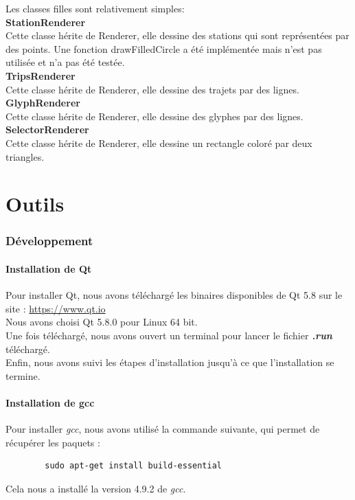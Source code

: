 \documentclass[12pt]{article}
\begin{document}
		Les classes filles sont relativement simples:\\
		
		\textbf{StationRenderer}\\
		Cette classe hérite de Renderer, elle dessine des stations qui sont représentées par des points. Une fonction drawFilledCircle a été implémentée mais n’est pas utilisée et n’a pas été testée.\\
		
		\textbf{TripsRenderer}\\
		Cette classe hérite de Renderer, elle dessine des trajets par des lignes. \\

		\textbf{GlyphRenderer}\\
		Cette classe hérite de Renderer, elle dessine des glyphes par des lignes. \\
		
		\textbf{SelectorRenderer}\\
		Cette classe hérite de Renderer, elle dessine un rectangle coloré par deux triangles.
		
\newpage
\part{Outils}
	\section{Développement}
		\subsection{Installation de Qt}
		Pour installer Qt, nous avons téléchargé les binaires disponibles de Qt 5.8
		sur le site :  \url{https://www.qt.io} \\
		
		Nous avons choisi Qt 5.8.0 pour Linux 64 bit.\\
		Une fois téléchargé, nous avons ouvert un terminal pour lancer le fichier \textit{\textbf{.run}} téléchargé.\\
		Enfin, nous avons suivi les étapes d'installation jusqu'à ce que l'installation se termine.
		
		\subsection{Installation de gcc}
		Pour installer \textit{gcc}, nous avons utilisé la commande suivante, qui permet de récupérer les paquets :
		\begin{verbatim}
		sudo apt-get install build-essential
		\end{verbatim}
		Cela nous a installé la version 4.9.2 de \textit{gcc}.
		
\end{document}
